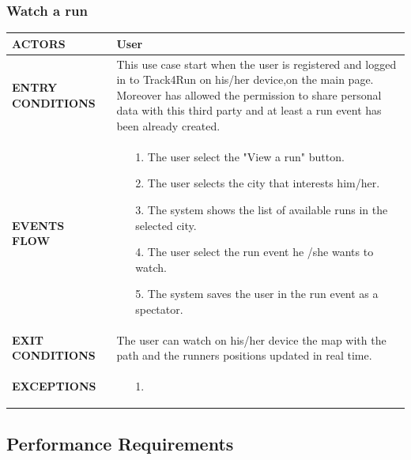 \documentclass[a4paper]{article}
\begin{document}
\vspace{1cm}

\subsubsection{Watch a run}
\begin{center}
    \begin{tabular}{l || p{8cm} ||}
        \bf{ACTORS} & User \\ \hline
        \bf{ENTRY CONDITIONS} & This use case start when the user is registered and logged in to Track4Run on his/her device,on the main page. Moreover has allowed the permission to share personal data with this third party and at least a run event has been already created. \\ \hline
        \bf{EVENTS FLOW} & \begin{itemize}[noitemsep, topsep=0cm, leftmargin=*] \vspace{-0.2cm}
            \item[1.] The user select the "View a run" button.
            \item[2.] The user selects the city that interests him/her. 
            \item[3.] The system shows the list of available runs in the selected city.
            \item[4.] The user select the run event he /she wants to watch.
            \item[5.] The system saves the user in the run event as a spectator.
        \end{itemize}
        \\ \hline
        \bf{EXIT CONDITIONS} & The user can watch on his/her device the map with the path and the runners positions updated in real time. \\ \hline
        \bf{EXCEPTIONS} & \begin{itemize}[noitemsep, topsep=0cm, leftmargin=*] \vspace{-0.2cm}
            \item[1.] 
        \end{itemize}
        \\ \hline \hline
    \end{tabular}
\end{center}
    
    \subsection{Performance Requirements}
    
\end{document}
